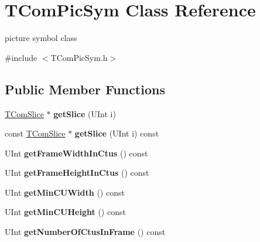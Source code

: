 \hypertarget{class_t_com_pic_sym}{}\section{T\+Com\+Pic\+Sym Class Reference}
\label{class_t_com_pic_sym}


picture symbol class  




{\ttfamily \#include $<$T\+Com\+Pic\+Sym.\+h$>$}

\subsection*{Public Member Functions}
\begin{DoxyCompactItemize}
\item 
\mbox{\label{class_t_com_pic_sym_a2f7d839af0e5ad3ecc2708b7fea427b4}} 
\hyperlink{class_t_com_slice}{T\+Com\+Slice} $\ast$ {\bfseries get\+Slice} (U\+Int i)
\item 
\mbox{\label{class_t_com_pic_sym_a7fda9645fd65ed0a07cfd4a3fb946a20}} 
const \hyperlink{class_t_com_slice}{T\+Com\+Slice} $\ast$ {\bfseries get\+Slice} (U\+Int i) const
\item 
\mbox{\label{class_t_com_pic_sym_a94445dd74eb1214d61862cbcb221cb56}} 
U\+Int {\bfseries get\+Frame\+Width\+In\+Ctus} () const
\item 
\mbox{\label{class_t_com_pic_sym_a27874cfd5529f9cf0f31c91d67d4ad7c}} 
U\+Int {\bfseries get\+Frame\+Height\+In\+Ctus} () const
\item 
\mbox{\label{class_t_com_pic_sym_aaf87bc359059c8e89a335831ab77fb32}} 
U\+Int {\bfseries get\+Min\+C\+U\+Width} () const
\item 
\mbox{\label{class_t_com_pic_sym_aad8931cda1c3bc61b69c604e2442e01a}} 
U\+Int {\bfseries get\+Min\+C\+U\+Height} () const
\item 
\mbox{\label{class_t_com_pic_sym_adb80f2451eae5eec856ca9e753647220}} 
U\+Int {\bfseries get\+Number\+Of\+Ctus\+In\+Frame} () const
\item 

\end{DoxyCompactItemize}
